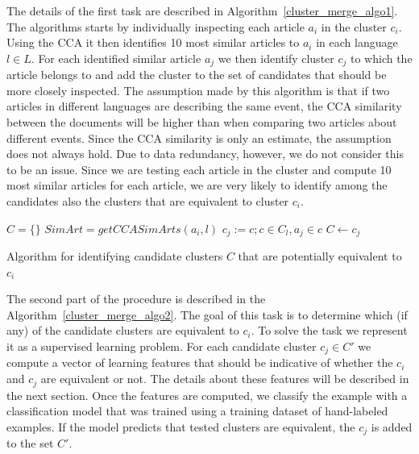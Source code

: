\documentclass[twoside,11pt]{article}
\begin{document}
The details of the first task are described in Algorithm~\ref{cluster_merge_algo1}. The algorithms starts by individually inspecting each article $a_i$ in the cluster $c_i$. Using the CCA it then identifies 10 most similar articles to $a_i$ in each language $l \in L$. For each identified similar article $a_j$ we then identify cluster $c_j$ to which the article belongs to and add the cluster to the set of candidates that should be more closely inspected. The assumption made by this algorithm is that if two articles in different languages are describing the same event, the CCA similarity between the documents will be higher than when comparing two articles about different events. Since the CCA similarity is only an estimate, the assumption does not always hold. Due to data redundancy, however, we do not consider this to be an issue. Since we are testing each article in the cluster and compute 10 most similar articles for each article, we are very likely to identify among the candidates also the clusters that are equivalent to cluster $c_i$.

\begin{algorithm}[t!]
$C = \{\}$\;
 {
     {
        $SimArt = getCCASimArts(a_i, l)$\;
         {
            $c_j := c ; c \in C_l, a_j \in c$\;
            $C \leftarrow c_j$\;
        }
    }
}
\caption{Algorithm for identifying candidate clusters $C$ that are potentially equivalent to $c_i$}
\label{cluster_merge_algo1}
\end{algorithm}

The second part of the procedure is described in the Algorithm~\ref{cluster_merge_algo2}. The goal of this task is to determine which (if any) of the candidate clusters are equivalent to $c_i$. To solve the task we represent it as a supervised learning problem. For each candidate cluster $c_j \in C'$ we compute a vector of learning features that should be indicative of whether the $c_i$ and $c_j$ are equivalent or not. The details about these features will be described in the next section. Once the features are computed, we classify the example with a classification model that was trained using a training dataset of hand-labeled examples. If the model predicts that tested clusters are equivalent, the $c_j$ is added to the set $C'$.
\end{document}
